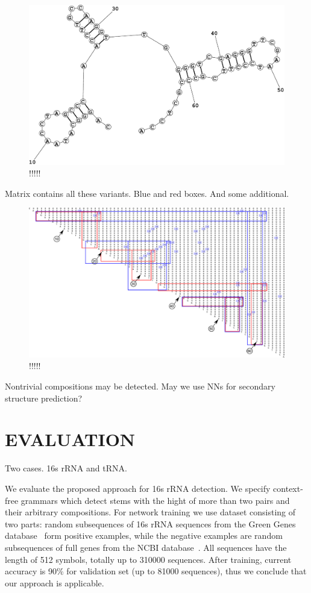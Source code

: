 \documentclass[a4paper,twoside]{article}
\begin{document}
\begin{figure}
\centering
\includegraphics[width=.5\textwidth]{figures/Fold2.pdf}
\caption{!!!!!}
\label{fig:!!!}
\end{figure}


Matrix contains all these variants.
Blue and red boxes.
And some additional.

\begin{figure}
\centering
\includegraphics[width=.98\textwidth]{figures/0m.pdf}
\caption{!!!!!}
\label{fig:!!!}
\end{figure}

Nontrivial compositions may be detected.
May we use NNs for secondary structure prediction?


\section{\uppercase{Evaluation}}
\label{sec:evaluation}

Two cases. 
16s rRNA and tRNA.

\noindent We evaluate the proposed approach for 16s rRNA detection.
We specify context-free grammars which detect stems with the hight of more than two pairs and their arbitrary compositions.
For network training we use dataset consisting of two parts: random subsequences of 16s rRNA sequences from the Green Genes database~\cite{pmid16820507} form positive examples, while the negative examples are random subsequences of full genes from the NCBI database~\cite{pmid19854944}.
All sequences have the length of 512 symbols, totally up to 310000 sequences.
After training, current accuracy is 90\% for validation set (up to 81000 sequences), thus we conclude that our approach is applicable.
\end{document}
